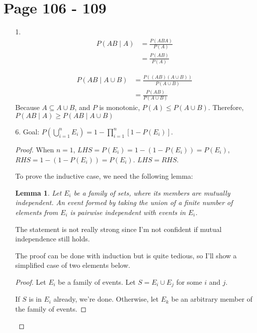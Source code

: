 \documentclass{article}
\newtheorem{lemma}{Lemma}
\begin{document}
\section*{Page 106 - 109}
\begin{itemize}
\item [1.]
  \begin{equation*}
    \begin{split}
      P(AB \mid A) &= \frac{P(ABA)}{P(A)}\\
      &= \frac{P(AB)}{P(A)}
    \end{split}
  \end{equation*}

  \begin{equation*}
    \begin{split}
      P(AB \mid A \cup B) &= \frac{P((AB)(A \cup B))}{P(A \cup B)}\\
      &= \frac{P(AB)}{P(A \cup B)}
    \end{split}
  \end{equation*}
  Because $A \subseteq A \cup B$, and $P$ is monotonic, $P(A) \leq P(A
  \cup B)$. Therefore, $P(AB \mid A) \geq P(AB \mid A \cup B)$
\item [6.]
  Goal: $P(\bigcup_{i=1}^nE_i) = 1 - \prod_{i=1}^n [1- P(E_i)]$.
  \begin{proof}
    When $n=1$, $LHS=P(E_i) = 1- (1- P(E_i)) = P(E_i)$, \(RHS = 1-
    (1-P(E_i)) = P(E_i)\). $LHS=RHS$.

    To prove the inductive case, we need the following lemma:
    \begin{lemma}
      Let $E_i$ be a family of sets, where its members are mutually
      independent. An event formed by taking the union of a finite
      number of elements from $E_i$ is pairwise independent with
      events in $E_i$.
    \end{lemma}
    The statement is not really strong since I'm not confident if
    mutual independence still holds.
    
    The proof can be done with induction but is quite tedious, so I'll
    show a simplified case of two elements below.

    \begin{proof}
      Let $E_i$ be a family of events. Let $S = E_i \cup E_j$ for
      some $i$ and $j$.

      If $S$ is in $E_i$ already, we're done. Otherwise, let $E_k$ be
      an arbitrary member of the family of events.


\end{proof}
\end{proof}
\end{itemize}
\end{document}
